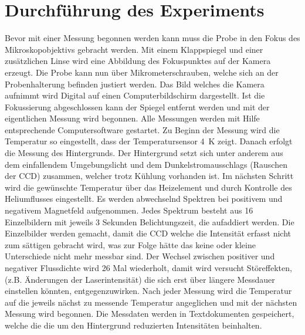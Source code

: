 \section{Durchführung des Experiments}
Bevor mit einer Messung begonnen werden kann muss die Probe in den Fokus des Mikroskopobjektivs 
gebracht werden. 
Mit einem Klappspiegel und einer zusätzlichen Linse wird eine Abbildung des 
Fokuspunktes auf der Kamera erzeugt. 
Die Probe kann nun über Mikrometerschrauben, welche sich an der 
Probenhalterung befinden justiert werden.
Das Bild welches die Kamera aufnimmt wird Digital auf einen Computerbildschirm dargestellt. 
Ist die Fokussierung abgeschlossen kann der Spiegel entfernt werden und mit der eigentlichen Messung 
wird begonnen.
Alle Messungen werden mit Hilfe entsprechende Computersoftware gestartet.
%
Zu Beginn der Messung wird die Temperatur so eingestellt, dass der Temperatursensor \SI{4}{\kelvin} zeigt. 
Danach erfolgt die Messung des Hintergrunds.
Der Hintergrund setzt sich unter anderem aus dem einfallendem Umgebungslicht und 
dem Dunkelstromausschlags (Rauschen der CCD) zusammen, welcher trotz Kühlung vorhanden ist.
Im nächsten Schritt wird die gewünschte Temperatur über das Heizelement und durch 
Kontrolle des Heliumflusses eingestellt. 
Es werden abwechselnd Spektren bei positivem und negativem Magnetfeld aufgenommen. 
Jedes Spektrum besteht aus 16 Einzelbildern mit jeweils 3 Sekunden Belichtungszeit, die aufaddiert werden.
Die Einzelbilder werden gemacht, damit die CCD welche die Intensität erfasst nicht zum sättigen 
gebracht wird, was zur Folge hätte das keine oder kleine Unterschiede nicht mehr messbar sind.
Der Wechsel zwischen positiver und negativer Flussdichte wird 26 Mal wiederholt, damit 
wird versucht Störeffekten, (z.B. Änderungen der Laserintensität) die sich erst über 
längere Messdauer einstellen könnten, entgegenzuwirken.
Nach jeder Messung wird die Temperatur auf die jeweils nächst zu messende Temperatur angeglichen
und mit der nächsten Messung wird begonnen.
Die Messdaten werden in Textdokumenten gespeichert, welche die die um den Hintergrund 
reduzierten Intensitäten beinhalten.

